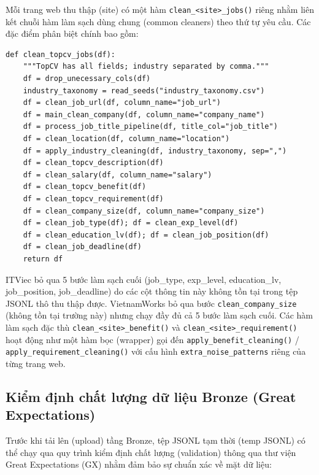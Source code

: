 Mỗi trang web thu thập (site) có một hàm \texttt{clean\_<site>\_jobs()} riêng nhằm liên kết chuỗi hàm làm sạch dùng chung (common cleaners)
theo thứ tự yêu cầu. Các đặc điểm phân biệt chính bao gồm:

\begin{lstlisting}[style=pystyle, caption={TopCV: dãy cleaner đầy đủ}, label={lst:clean-topcv}]
def clean_topcv_jobs(df):
    """TopCV has all fields; industry separated by comma."""
    df = drop_unecessary_cols(df)
    industry_taxonomy = read_seeds("industry_taxonomy.csv")
    df = clean_job_url(df, column_name="job_url")
    df = main_clean_company(df, column_name="company_name")
    df = process_job_title_pipeline(df, title_col="job_title")
    df = clean_location(df, column_name="location")
    df = apply_industry_cleaning(df, industry_taxonomy, sep=",")
    df = clean_topcv_description(df)
    df = clean_salary(df, column_name="salary")
    df = clean_topcv_benefit(df)
    df = clean_topcv_requirement(df)
    df = clean_company_size(df, column_name="company_size")
    df = clean_job_type(df); df = clean_exp_level(df)
    df = clean_education_lv(df); df = clean_job_position(df)
    df = clean_job_deadline(df)
    return df
\end{lstlisting}

ITViec bỏ qua 5 bước làm sạch cuối (job\_type, exp\_level, education\_lv,
job\_position, job\_deadline) do các cột thông tin này không tồn tại trong tệp JSONL thô thu thập được.
VietnamWorks bỏ qua bước \texttt{clean\_company\_size} (không tồn tại trường này) nhưng
chạy đầy đủ cả 5 bước làm sạch cuối. Các hàm làm sạch đặc thù \texttt{clean\_<site>\_benefit()}
và \texttt{clean\_<site>\_requirement()} hoạt động như một hàm bọc (wrapper) gọi đến
\texttt{apply\_benefit\_cleaning()} / \texttt{apply\_requirement\_cleaning()}
với cấu hình \texttt{extra\_noise\_patterns} riêng của từng trang web.

\subsection{Kiểm định chất lượng dữ liệu Bronze (Great Expectations)}
\label{subsec:validation}

Trước khi tải lên (upload) tầng Bronze, tệp JSONL tạm thời (temp JSONL) có thể chạy qua quy trình kiểm định chất lượng (validation)
thông qua thư viện Great Expectations (GX) nhằm đảm bảo sự chuẩn xác về mặt dữ liệu:

